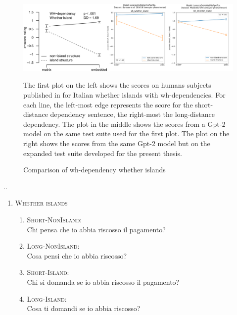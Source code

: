 \begin{figure}
	\centering
	\includegraphics[width=1\textwidth]{images/Chapter1/combined_wh-whether.png} %
	\caption{Comparison of wh-dependency whether islands} 
	\label{fig:wh_whether} %
	\medskip
	\small
	The first plot on the left shows the scores on humans subjects published in \citet{sprouse2016experimental} for Italian whether islands with wh-dependencies. For each line, the left-most edge represents the score for the short-distance dependency sentence, the right-most the long-distance dependency. The plot in the middle shows the scores from a Gpt-2 model \citep{de2020geppetto} on the same test suite used for the first plot. The plot on the right shows the scores from the same Gpt-2 model but on the expanded test suite developed for the present thesis.
\end{figure}

..
\renewcommand{\labelenumi}{(\arabic{enumi})}
\begin{enumerate}
	\item \textsc{Whether islands}
	\renewcommand{\labelenumii}{\alph{enumii}.}
	\begin{enumerate}
		\item \textsc{Short-NonIsland:} \\
				Chi pensa che io abbia riscosso il pagamento?
		\item \textsc{Long-NonIsland:} \\
				Cosa pensi che io abbia riscosso?
		\item \textsc{Short-Island:} \\
				Chi si domanda se io abbia riscosso il pagamento?
		\item \textsc{Long-Island:} \\				
				Cosa ti domandi se io abbia riscosso?
				
	\end{enumerate}
\end{enumerate}


